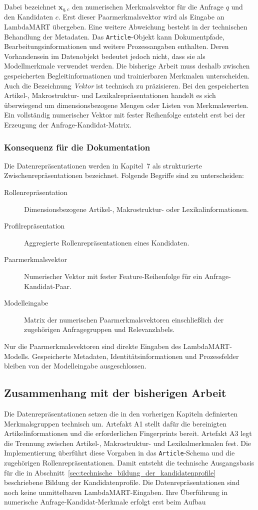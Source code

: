 Dabei bezeichnet $\boldsymbol{x}_{q,c}$ den numerischen Merkmalsvektor für die Anfrage $q$ und den Kandidaten $c$. Erst dieser Paarmerkmalsvektor wird als Eingabe an LambdaMART übergeben. Eine weitere Abweichung besteht in der technischen Behandlung der Metadaten. Das \texttt{Article}-Objekt kann Dokumentpfade, Bearbeitungsinformationen und weitere Prozessangaben enthalten. Deren Vorhandensein im Datenobjekt bedeutet jedoch nicht, dass sie als Modellmerkmale verwendet werden. Die bisherige Arbeit muss deshalb zwischen gespeicherten Begleitinformationen und trainierbaren Merkmalen unterscheiden. Auch die Bezeichnung \textit{Vektor} ist technisch zu präzisieren. Bei den gespeicherten Artikel-, Makrostruktur- und Lexikalrepräsentationen handelt es sich überwiegend um dimensionsbezogene Mengen oder Listen von Merkmalswerten. Ein vollständig numerischer Vektor mit fester Reihenfolge entsteht erst bei der Erzeugung der Anfrage-Kandidat-Matrix. \subsubsection*{Konsequenz für die Dokumentation} Die Datenrepräsentationen werden in Kapitel~7 als strukturierte Zwischenrepräsentationen bezeichnet. Folgende Begriffe sind zu unterscheiden: \begin{description} \item[Rollenrepräsentation] Dimensionsbezogene Artikel-, Makrostruktur- oder Lexikalinformationen. \item[Profilrepräsentation] Aggregierte Rollenrepräsentationen eines Kandidaten. \item[Paarmerkmalsvektor] Numerischer Vektor mit fester Feature-Reihenfolge für ein Anfrage-Kandidat-Paar. \item[Modelleingabe] Matrix der numerischen Paarmerkmalsvektoren einschließlich der zugehörigen Anfragegruppen und Relevanzlabels. \end{description} Nur die Paarmerkmalsvektoren sind direkte Eingaben des LambdaMART-Modells. Gespeicherte Metadaten, Identitätsinformationen und Prozessfelder bleiben von der Modelleingabe ausgeschlossen. \subsection{Zusammenhang mit der bisherigen Arbeit} \label{subsec:zusammenhang_datenrepraesentationen} Die Datenrepräsentationen setzen die in den vorherigen Kapiteln definierten Merkmalsgruppen technisch um. Artefakt A1 stellt dafür die bereinigten Artikelinformationen und die erforderlichen Fingerprints bereit. Artefakt A3 legt die Trennung zwischen Artikel-, Makrostruktur- und Lexikalmerkmalen fest. Die Implementierung überführt diese Vorgaben in das \texttt{Article}-Schema und die zugehörigen Rollenrepräsentationen. Damit entsteht die technische Ausgangsbasis für die in Abschnitt~\ref{sec:technische_bildung_der_kandidatenprofile} beschriebene Bildung der Kandidatenprofile. Die Datenrepräsentationen sind noch keine unmittelbaren LambdaMART-Eingaben. Ihre Überführung in numerische Anfrage-Kandidat-Merkmale erfolgt erst beim Aufbau 